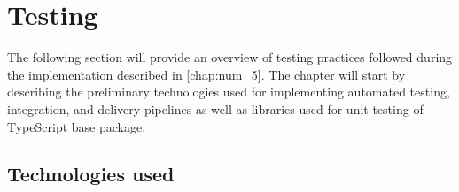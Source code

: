 \chapter{Testing}
\label{chap:num_7}

The following section will provide an overview of testing practices followed during the implementation described in \autoref{chap:num_5}. The chapter will start by describing the preliminary technologies used for implementing automated testing, integration, and delivery pipelines as well as libraries used for unit testing of TypeScript base \lpas{} package.

\section{Technologies used}

